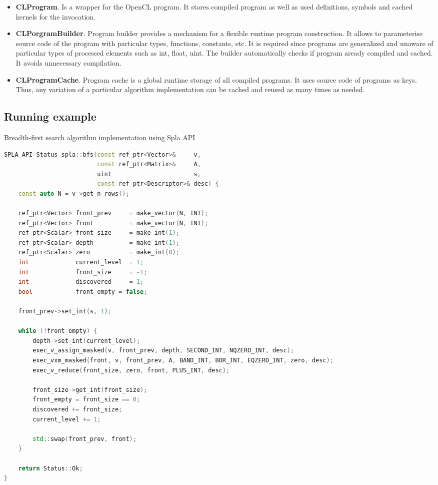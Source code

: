 \begin{itemize}
    \item \textbf{CLProgram}. Is a wrapper for the OpenCL program. It stores compiled program as well as used definitions, symbols and cached kernels for the invocation.
    \item \textbf{CLPorgramBuilder}. Program builder provides a mechanism for a flexible runtime program construction. It allows to parameterise source code of the program with particular types, functions, constants, etc. It is required since programs are generalized and unaware of particular types of processed elements such as int, float, uint. The builder automatically checks if program aready compiled and cached. It avoids unnecessary compilation.
    \item \textbf{CLProgramCache}. Program cache is a global runtime storage of all compiled programs. It uses source code of programs as keys. Thus, any variation of a particular algorithm implementation can be cached and reused as many times as needed.
\end{itemize}

\subsection{Running example}

\lstset{style=codelistingstyle}

\begin{algorithm}[]
\caption{Breadth-first search algorithm implementation using Spla API}
\label{alg:spla_bfs_example}
\begin{lstlisting}[language=C++]
SPLA_API Status spla::bfs(const ref_ptr<Vector>&     v,
                          const ref_ptr<Matrix>&     A,
                          uint                       s,
                          const ref_ptr<Descriptor>& desc) {
    const auto N = v->get_n_rows();

    ref_ptr<Vector> front_prev     = make_vector(N, INT);
    ref_ptr<Vector> front          = make_vector(N, INT);
    ref_ptr<Scalar> front_size     = make_int(1);
    ref_ptr<Scalar> depth          = make_int(1);
    ref_ptr<Scalar> zero           = make_int(0);
    int             current_level  = 1;
    int             front_size     = -1;
    int             discovered     = 1;
    bool            front_empty = false;
    
    front_prev->set_int(s, 1);

    while (!front_empty) {
        depth->set_int(current_level);
        exec_v_assign_masked(v, front_prev, depth, SECOND_INT, NQZERO_INT, desc);
        exec_vxm_masked(front, v, front_prev, A, BAND_INT, BOR_INT, EQZERO_INT, zero, desc);
        exec_v_reduce(front_size, zero, front, PLUS_INT, desc);
        
        front_size->get_int(front_size);
        front_empty = front_size == 0;
        discovered += front_size;
        current_level += 1;

        std::swap(front_prev, front);
    }

    return Status::Ok;
}
\end{lstlisting}
\end{algorithm}

